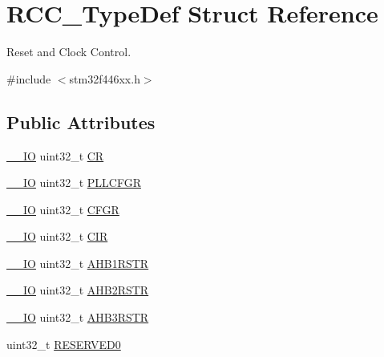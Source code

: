\hypertarget{struct_r_c_c___type_def}{}\section{R\+C\+C\+\_\+\+Type\+Def Struct Reference}
\label{struct_r_c_c___type_def}


Reset and Clock Control.  




{\ttfamily \#include $<$stm32f446xx.\+h$>$}

\subsection*{Public Attributes}
\begin{DoxyCompactItemize}
\item 
\hyperlink{core__sc300_8h_aec43007d9998a0a0e01faede4133d6be}{\+\_\+\+\_\+\+IO} uint32\+\_\+t \hyperlink{struct_r_c_c___type_def_abcb9ff48b9afb990283fefad0554b5b3}{CR}
\item 
\hyperlink{core__sc300_8h_aec43007d9998a0a0e01faede4133d6be}{\+\_\+\+\_\+\+IO} uint32\+\_\+t \hyperlink{struct_r_c_c___type_def_a2a7ccb4e23cb05a574f243f6278b7b26}{P\+L\+L\+C\+F\+GR}
\item 
\hyperlink{core__sc300_8h_aec43007d9998a0a0e01faede4133d6be}{\+\_\+\+\_\+\+IO} uint32\+\_\+t \hyperlink{struct_r_c_c___type_def_a0721b1b729c313211126709559fad371}{C\+F\+GR}
\item 
\hyperlink{core__sc300_8h_aec43007d9998a0a0e01faede4133d6be}{\+\_\+\+\_\+\+IO} uint32\+\_\+t \hyperlink{struct_r_c_c___type_def_aeadf3a69dd5795db4638f71938704ff0}{C\+IR}
\item 
\hyperlink{core__sc300_8h_aec43007d9998a0a0e01faede4133d6be}{\+\_\+\+\_\+\+IO} uint32\+\_\+t \hyperlink{struct_r_c_c___type_def_ad6abf71a348744aa3f2b7e8b214c1ca4}{A\+H\+B1\+R\+S\+TR}
\item 
\hyperlink{core__sc300_8h_aec43007d9998a0a0e01faede4133d6be}{\+\_\+\+\_\+\+IO} uint32\+\_\+t \hyperlink{struct_r_c_c___type_def_a343e0230ded55920ff2a04fbde0e5bcd}{A\+H\+B2\+R\+S\+TR}
\item 
\hyperlink{core__sc300_8h_aec43007d9998a0a0e01faede4133d6be}{\+\_\+\+\_\+\+IO} uint32\+\_\+t \hyperlink{struct_r_c_c___type_def_a39a90d838fbd0b8515f03e4a1be6374f}{A\+H\+B3\+R\+S\+TR}
\item 
uint32\+\_\+t \hyperlink{struct_r_c_c___type_def_a646631532167f3386763a2d10a881a04}{R\+E\+S\+E\+R\+V\+E\+D0}
\item 

\end{DoxyCompactItemize}
